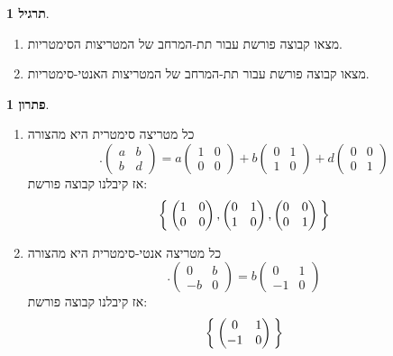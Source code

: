\documentclass[12pt]{report}
\theoremstyle{plain}
\theoremstyle{definition}
\newtheorem{exercise}{תרגיל}[chapter]
\newtheorem*{solution}{פתרון}
\newcommand{\F}{\mathbb{F}}
\newcommand{\M}{\mathbb{M}}
\newcommand{\0}{\mathbf{0}}
\begin{document}
\begin{exercise}
\begin{enumerate}[label=\alph*.]
נסתכל על 
$\M_{2\times 2}(\F)$.
כל תת-מרחב הוא מ"ו בפני עצמו וניתן למצוא לו קבוצה פורשת.
\item
מצאו קבוצה פורשת עבור תת-המרחב של המטריצות הסימטריות.


\item 
מצאו קבוצה פורשת עבור תת-המרחב של המטריצות האנטי-סימטריות.


\end{enumerate}
\end{exercise}

\begin{solution}\
\begin{enumerate}[label=\alph*.]
\item 
כל מטריצה סימטרית היא מהצורה
$$
.\begin{pmatrix}
a & b\\
b & d
\end{pmatrix}=a\begin{pmatrix}
1 & 0\\
0 & 0
\end{pmatrix}+b\begin{pmatrix}
0 & 1\\
1 & 0
\end{pmatrix}+d\begin{pmatrix}
0 & 0\\
0 & 1
\end{pmatrix}
$$
אז קיבלנו קבוצה פורשת:
$$
\Set{\begin{pmatrix}
1 & 0\\
0 & 0
\end{pmatrix},\begin{pmatrix}
0 & 1\\
1 & 0
\end{pmatrix},\begin{pmatrix}
0 & 0\\
0 & 1
\end{pmatrix}}
$$


\item
כל מטריצה אנטי-סימטרית היא מהצורה
$$
.\begin{pmatrix}
0 & b\\
-b & 0
\end{pmatrix}=b\begin{pmatrix}
0 & 1\\
-1 & 0
\end{pmatrix}
$$
אז קיבלנו קבוצה פורשת:
$$
\Set{\begin{pmatrix}
0 & 1\\
-1 & 0
\end{pmatrix}}
$$


\end{enumerate}
\end{solution}
\end{document}
